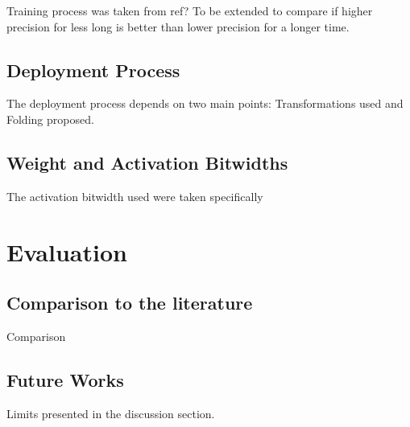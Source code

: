 Training process was taken from ref? To be extended to compare if higher precision for less long is better than lower precision for a longer time.


\subsection{Deployment Process}

The deployment process depends on two main points: Transformations used and Folding proposed.


\subsection{Weight and Activation Bitwidths}

The activation bitwidth used were taken specifically


\section{Evaluation}


\subsection{Comparison to the literature}

Comparison


\subsection{Future Works}

Limits presented in the discussion section.
